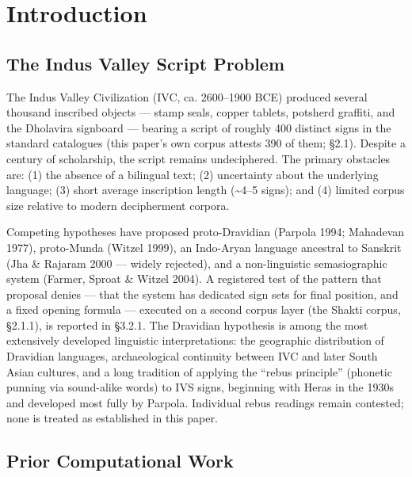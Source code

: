 \documentclass[11pt]{article}
\newcounter{none} %
\begin{document}
\section{Introduction}\label{introduction}

\subsection{The Indus Valley Script
Problem}\label{the-indus-valley-script-problem}

The Indus Valley Civilization (IVC, ca. 2600--1900 BCE) produced several thousand inscribed objects --- stamp seals, copper tablets, potsherd graffiti, and the Dholavira signboard --- bearing a script of roughly 400 distinct signs in the standard catalogues (this paper's own corpus attests 390 of them; §2.1). Despite a century of scholarship, the script remains undeciphered. The primary obstacles are: (1)
the absence of a bilingual text; (2) uncertainty about the underlying
language; (3) short average inscription length (\textasciitilde4--5
signs); and (4) limited corpus size relative to modern decipherment
corpora.

Competing hypotheses have proposed proto-Dravidian (Parpola 1994;
Mahadevan 1977), proto-Munda (Witzel 1999), an Indo-Aryan language
ancestral to Sanskrit (Jha \& Rajaram 2000 --- widely rejected), and a
non-linguistic semasiographic system (Farmer, Sproat \& Witzel 2004). A registered test of the pattern that proposal denies --- that the system has dedicated sign sets for final position, and a fixed opening formula --- executed on a second corpus layer (the Shakti corpus, §2.1.1), is reported in §3.2.1.
The Dravidian hypothesis is among the most extensively developed linguistic interpretations: the
geographic distribution of Dravidian languages, archaeological
continuity between IVC and later South Asian cultures, and a long tradition of applying the ``rebus principle'' (phonetic punning via sound-alike words) to IVS signs, beginning with Heras in the 1930s and developed most fully by Parpola. Individual rebus readings remain contested; none is treated as established in this paper.

\subsection{Prior Computational
Work}\label{prior-computational-work}
\end{document}
